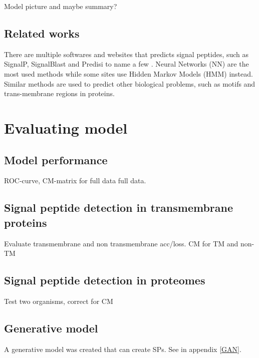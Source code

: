 Model picture and maybe summary?


\subsection{Related works}

There are multiple softwares and websites that predicts signal peptides, such as SignalP, SignalBlast and Predisi to name a few \cite{sp_predict1} \cite{sp_predict2} \cite{sp_predict3}. Neural Networks (NN) are the most used methods while some sites use Hidden Markov Models (HMM) instead. Similar methods are used to predict other biological problems, such as motifs and trans-membrane regions in proteins.


\section{Evaluating model}

\subsection{Model performance}
ROC-curve, CM-matrix for full data full data.

\subsection{Signal peptide detection in transmembrane proteins}
Evaluate transmembrane and non transmembrane acc/loss.
CM for TM and non-TM

\subsection{Signal peptide detection in proteomes}
Test two organisms, correct for CM

\subsection{Generative model}
A generative model was created that can create SPs. See in appendix \ref{GAN}.


